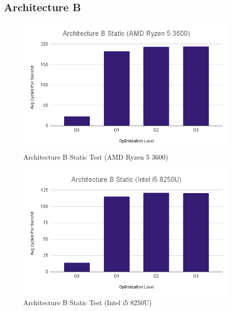 \documentclass{article}
\begin{document}
\subsection{Architecture B}
\begin{figure}[!h]
\centering
\includegraphics[scale=0.5]{Architecture B Static (AMD Ryzen 5 3600).png}
\caption{Architecture B Static Test (AMD Ryzen 5 3600)}
\label{arch_b_static_pc}
\end{figure}

\begin{figure}[!h]
\centering
\includegraphics[scale=0.5]{Architecture B Static (Intel i5 8250U).png}
\caption{Architecture B Static Test (Intel i5 8250U)}
\label{arch_b_static_laptop}
\end{figure}
\end{document}
